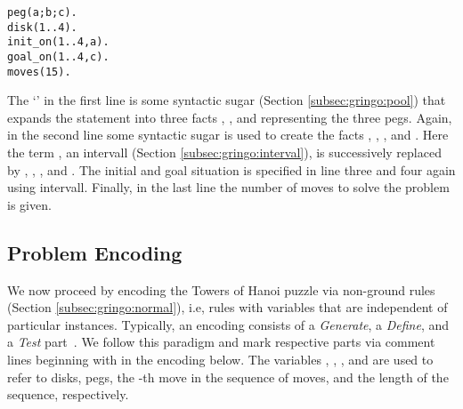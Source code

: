 \begin{lstlisting}
peg(a;b;c).
disk(1..4).
init_on(1..4,a).
goal_on(1..4,c).
moves(15).
\end{lstlisting}

The `\code{;}' in the first line is some syntactic sugar (Section \ref{subsec:gringo:pool})
that expands the statement into three facts
, , and  representing the three pegs.
Again, in the second line some syntactic sugar is used to 
create the facts , , , and .
Here the term , an intervall (Section \ref{subsec:gringo:interval}), is successively replaced by , , , and .
The initial and goal situation is specified in line three and four again using intervall.
Finally, in the last line the number of moves to solve the problem is given.

\subsection{Problem Encoding}

We now proceed by encoding the Towers of Hanoi puzzle via non-ground rules (Section \ref{subsec:gringo:normal}), 
i.e, rules with variables that are independent of particular instances.
Typically, an encoding consists of a \emph{Generate}, a \emph{Define},
and a \emph{Test} part~\cite{lifschitz02a}.
We follow this paradigm and
mark respective parts via comment lines beginning with \code{\%} in the encoding below.
The variables , , , and  are used
to refer to disks, pegs, the -th move in the sequence of moves, and the length of the sequence, respectively.

